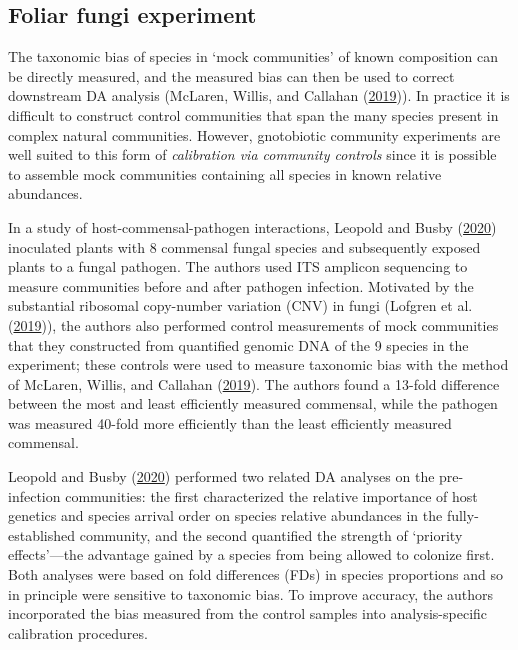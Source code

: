 \documentclass[
]{article}
\begin{document}
\hypertarget{foliar-fungi-experiment}{%
\subsection{Foliar fungi experiment}\label{foliar-fungi-experiment}}

The taxonomic bias of species in `mock communities' of known composition can be directly measured, and the measured bias can then be used to correct downstream DA analysis (McLaren, Willis, and Callahan (\protect\hyperlink{ref-mclaren2019cons}{2019})).
In practice it is difficult to construct control communities that span the many species present in complex natural communities.
However, gnotobiotic community experiments are well suited to this form of \emph{calibration via community controls} since it is possible to assemble mock communities containing all species in known relative abundances.

In a study of host-commensal-pathogen interactions, Leopold and Busby (\protect\hyperlink{ref-leopold2020host}{2020}) inoculated plants with 8 commensal fungal species and subsequently exposed plants to a fungal pathogen.
The authors used ITS amplicon sequencing to measure communities before and after pathogen infection.
Motivated by the substantial ribosomal copy-number variation (CNV) in fungi (Lofgren et al. (\protect\hyperlink{ref-lofgren2019geno}{2019})), the authors also performed control measurements of mock communities that they constructed from quantified genomic DNA of the 9 species in the experiment; these controls were used to measure taxonomic bias with the method of McLaren, Willis, and Callahan (\protect\hyperlink{ref-mclaren2019cons}{2019}).
The authors found a 13-fold difference between the most and least efficiently measured commensal, while the pathogen was measured 40-fold more efficiently than the least efficiently measured commensal.

Leopold and Busby (\protect\hyperlink{ref-leopold2020host}{2020}) performed two related DA analyses on the pre-infection communities: the first characterized the relative importance of host genetics and species arrival order on species relative abundances in the fully-established community, and the second quantified the strength of `priority effects'---the advantage gained by a species from being allowed to colonize first.
Both analyses were based on fold differences (FDs) in species proportions and so in principle were sensitive to taxonomic bias.
To improve accuracy, the authors incorporated the bias measured from the control samples into analysis-specific calibration procedures.
\end{document}
